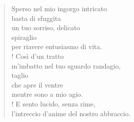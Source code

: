 
\begin{verse}
    Sperso nel mio ingorgo intricato\\
    basta di sfuggita\\
    un tuo sorriso, delicato\\
    spiraglio\\
    per riavere entusiasmo di vita.\\!
    Così d'un tratto\\
    m'imbatto nel tuo sguardo randagio,\\
    taglio\\
    che apre il ventre\\
    mentre sono a mio agio.\\!
    E sento lucido, senza rime,\\
    l'intreccio d'anime del nostro abbraccio.
    
\end{verse}